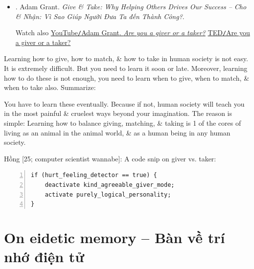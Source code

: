 \documentclass[12pt,twoside]{book}
\begin{document}
\begin{itemize}
\begin{itemize}
		{\sf[en]$\to$[vi]} Nghiên cứu chứng minh rằng những người cho đi sẽ chìm xuống đáy của bậc thang thành công. Trong nhiều ngành nghề quan trọng, người cho đi gặp bất lợi: họ làm cho người khác được lợi hơn nhưng lại hy sinh thành công của chính mình trong quá trình này.
		
		\item {\it``Meyer summarizes his code of honor as ``(1) Show up. (2) Work hard. (3) Be kind. (4) Take the high road.''''}
		
		{\sf[en]$\to$[vi]} Meyer tóm tắt quy tắc danh dự của mình là ``(1) Xuất hiện. (2) Làm việc chăm chỉ. (3) Hãy tử tế. (4) Đi đường cao tốc.
	\end{itemize}
	Với bản dịch tiếng Việt:
	\item \cite{Grant_give_take_VN}. {\sc Adam Grant}. {\it Give \& Take: Why Helping Others Drives Our Success -- Cho \& Nhận: Vì Sao Giúp Người Đưa Ta đến Thành Công?}.
	
	Watch also \href{https://www.youtube.com/watch?v=YyXRYgjQXX0}{YouTube{\tt/}{\sc Adam Grant}. {\it Are you a giver or a taker?}} \href{https://www.ted.com/talks/adam_grant_are_you_a_giver_or_a_taker}{TED{\tt/}Are you a giver or a taker?}
\end{itemize}
Learning how to give, how to match, \& how to take in human society is not easy. It is extremely difficult. But you need to learn it soon or late. Moreover, learning how to do these is not enough, you need to learn when to give, when to match, \& when to take also. Summarize:
\begin{center}
\end{center}
You have to learn these eventually. Because if not, human society will teach you in the most painful \& cruelest ways beyond your imagination. The reason is simple: Learning how to balance giving, matching, \& taking is 1 of the cores of living as an animal in the animal world, \& as a human being in any human society.

{\sf Hồng [25; computer scientist wannabe]}: A code snip on giver vs. taker:
\begin{Verbatim}[numbers=left,xleftmargin=5mm]
if (hurt_feeling_detector == true) {
    deactivate kind_agreeable_giver_mode;
    activate purely_logical_personality;
}
\end{Verbatim}

\section{On eidetic memory -- Bàn về trí nhớ điện tử}
\label{sect: eidetic memory}
\end{document}
